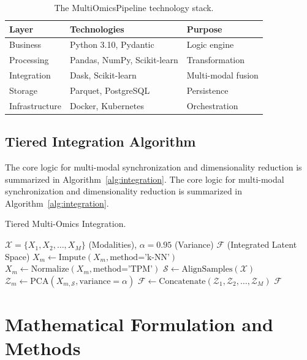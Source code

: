 \documentclass[conference,flushend]{iaria} %
\begin{document}
\begin{table}[H]
\caption{The MultiOmicsPipeline technology stack.}\label{tab:stack}
\centering
\small
\setlength{\tabcolsep}{3pt}
\begin{tabularx}{\textwidth}{L L L}
\toprule
\textbf{Layer} & \textbf{Technologies} & \textbf{Purpose} \\
\midrule
Business        & Python 3.10, Pydantic & Logic engine \\
Processing      & Pandas, NumPy, Scikit-learn & Transformation \\
Integration     & Dask, Scikit-learn    & Multi-modal fusion \\
Storage         & Parquet, PostgreSQL   & Persistence \\
Infrastructure  & Docker, Kubernetes    & Orchestration \\
\bottomrule
\end{tabularx}
\end{table}

\subsection{Tiered Integration Algorithm}
The core logic for multi-modal synchronization and dimensionality reduction is summarized in Algorithm~\ref{alg:integration}.
The core logic for multi-modal synchronization and dimensionality reduction is summarized in Algorithm~\ref{alg:integration}.

\begin{algorithm}[H]
\caption{Tiered Multi-Omics Integration.}\label{alg:integration}
\begin{algorithmic}[1]
\REQUIRE $\mathcal{X} = \{X_1, X_2, \dots, X_M\}$ (Modalities), $\alpha = 0.95$ (Variance)
\ENSURE $\mathcal{F}$ (Integrated Latent Space)
    \STATE $X_m \gets \text{Impute}(X_m, \text{method='k-NN'})$
    \STATE $X_m \gets \text{Normalize}(X_m, \text{method='TPM'})$
\ENDFOR
\STATE $\mathcal{S} \gets \text{AlignSamples}(\mathcal{X})$
    \STATE $\mathcal{Z}_m \gets \text{PCA}(X_{m, \mathcal{S}}, \text{variance}=\alpha)$
\ENDFOR
\STATE $\mathcal{F} \gets \text{Concatenate}(\mathcal{Z}_1, \mathcal{Z}_2, \dots, \mathcal{Z}_M)$
\RETURN $\mathcal{F}$
\end{algorithmic}
\end{algorithm}

\section{Mathematical Formulation and Methods}
\end{document}
